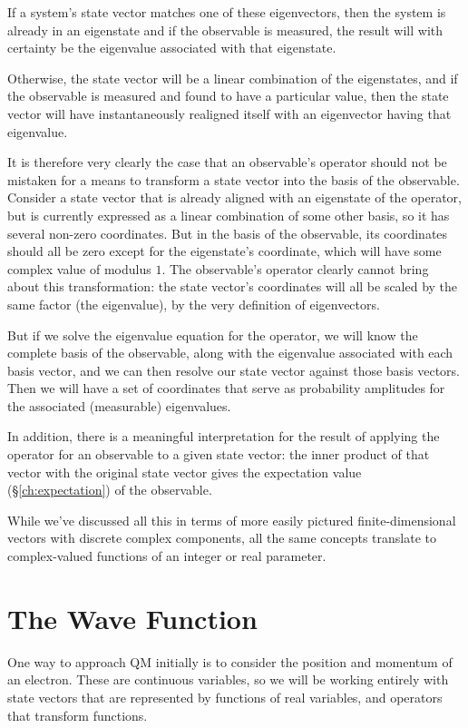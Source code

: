 If a system's state vector matches one of these eigenvectors, then the system is already in an eigenstate and if the observable is measured, the result will with certainty be the eigenvalue associated with that eigenstate.

Otherwise, the state vector will be a linear combination of the eigenstates, and if the observable is measured and found to have a particular value, then the state vector will have instantaneously realigned itself with an eigenvector having that eigenvalue.

It is therefore very clearly the case that an observable's operator should not be mistaken for a means to transform a state vector into the basis of the observable. Consider a state vector that is already aligned with an eigenstate of the operator, but is currently expressed as a linear combination of some other basis, so it has several non-zero coordinates. But in the basis of the observable, its coordinates should all be zero except for the eigenstate's coordinate, which will have some complex value of modulus $1$. The observable's operator clearly cannot bring about this transformation: the state vector's coordinates will all be scaled by the same factor (the eigenvalue), by the very definition of eigenvectors.

But if we solve the eigenvalue equation for the operator, we will know the complete basis of the observable, along with the eigenvalue associated with each basis vector, and we can then resolve our state vector against those basis vectors. Then we will have a set of coordinates that serve as probability amplitudes for the associated (measurable) eigenvalues.

In addition, there is a meaningful interpretation for the result of applying the operator for an observable to a given state vector: the inner product of that vector with the original state vector gives the expectation value (§\ref{ch:expectation}) of the observable.

While we've discussed all this in terms of more easily pictured finite-dimensional vectors with discrete complex components, all the same concepts translate to complex-valued functions of an integer or real parameter.

\section{The Wave Function}

One way to approach QM initially is to consider the position and momentum of an electron. These are continuous variables, so we will be working entirely with state vectors that are represented by functions of real variables, and operators that transform functions.

